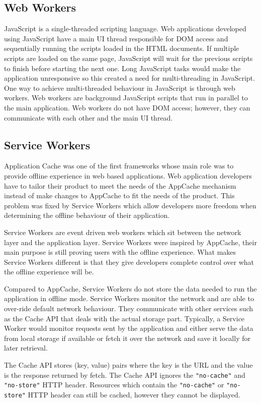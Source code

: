 \documentclass[10pt,a4paper,twoside]{book}
\begin{document}
\subsection{Web Workers}
JavaScript is a single-threaded scripting language. Web applications developed using JavaScript have a main UI thread responsible for DOM access and sequentially running the scripts loaded in the HTML documents. If multiple scripts are loaded on the same page, JavaScript will wait for the previous scripts to finish before starting the next one. Long JavaScript tasks would make the application unresponsive so this created a need for multi-threading in JavaScript. One way to achieve multi-threaded behaviour in JavaScript is through web workers. Web workers are background JavaScript scripts that run in parallel to the main application. Web workers do not have DOM access; however, they can communicate with each other and the main UI thread.

\subsection{Service Workers}
Application Cache was one of the first frameworks whose main role was to provide offline experience in web based applications. Web application developers have to tailor their product to meet the needs of the AppCache mechanism instead of make changes to AppCache to fit the needs of the product. This problem was fixed by Service Workers which allow developers more freedom when determining the offline behaviour of their application.

Service Workers are event driven web workers which sit between the network layer and the application layer. Service Workers were inspired by AppCache, their main purpose is still proving users with the offline experience. What makes Service Workers different is that they give developers complete control over what the offline experience will be. 

Compared to AppCache, Service Workers do not store the data needed to run the application in offline mode. Service Workers monitor the network and are able to over-ride default network behaviour. They communicate with other services such as the Cache API that deals with the actual storage part. Typically, a Service Worker would monitor requests sent by the application and either serve the data from local storage if available or fetch it over the network and save it locally for later retrieval. 

The Cache API stores (key, value) pairs where the key is the URL and the value is the response returned by fetch. The Cache API ignores the \texttt{"no-cache"} and \texttt{"no-store"} HTTP header. Resources which contain the \texttt{"no-cache"} or \texttt{"no-store"} HTTP header can still be cached, however they cannot be displayed. 
\end{document}
